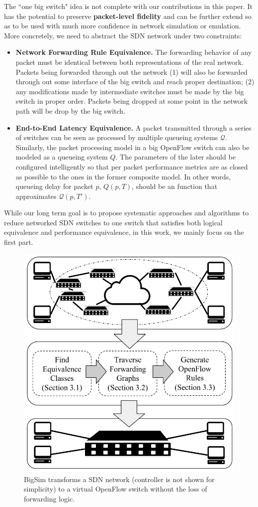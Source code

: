 The ``one big switch" idea is not complete with our contributions in this paper.
It has the potential to preserve \textbf{packet-level fidelity} and
can be further extend so as to be used with much more confidence in network
simulation or emulation.
More concretely, we need to abstract the SDN network under two constraints:
\begin{itemize}
\item \textbf{Network Forwarding Rule Equivalence.}
        The forwarding behavior of any packet must be identical
        between both representations of the real network. Packets being
        forwarded through out the network (1) will also be forwarded through out
        some interface of the big switch and reach proper destination;
        (2) any modifications made by intermediate switches must be made by the
        big switch in proper order.
        Packets being dropped at some point in the network path will be drop by the
        big switch.
\item \textbf{End-to-End Latency Equivalence.}
        A packet transmitted through a series of
        switches can be seen as processed by multiple queueing systems $\mathcal{Q}$.
        Similarly, the packet processing model in a big OpenFlow switch can
        also be modeled as a queueing system $Q$.
        The parameters of the later should be configured intelligently
        so that per packet performance metrics are as closed as possible to the ones
        in the former composite model.
        In other words, queueing delay for packet $p$, $Q(p, T)$, should be an
        function that approximates $\mathcal{Q}(p, T')$.
\end{itemize}

While our long term goal is to propose systematic approaches and algorithms to reduce
networked SDN switches to one switch that satisfies both logical equivalence and performance
equivalence, in this work, we mainly focus on the first part.

\begin{figure}[t]
\centering
\includegraphics[scale=.6]{figures/BigSimOverview.pdf}
\caption{BigSim transforms a SDN network (controller is not shown for simplicity) to a
virtual OpenFlow switch without the loss of forwarding logic.}
\label{Fig:BigSimOverview}
\end{figure}

